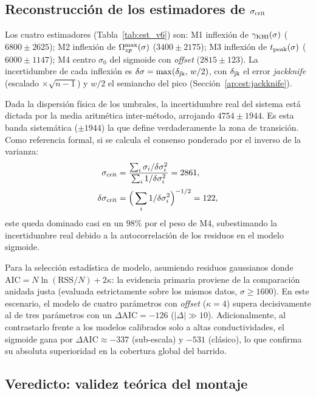 \subsection{Reconstrucción de los estimadores de $\sigma_{\mathrm{crit}}$}
\label{ap:estim}

\primerparrafo Los cuatro estimadores (Tabla~\ref{tab:est_v6}) son: M1 inflexión de $\gamma_{\mathrm{KHI}}(\sigma)$ ($6800\pm2625$); M2 inflexión de $\Omega_{zp}^{\max}(\sigma)$ ($3400\pm2175$); M3 inflexión de $t_{\rm peak}(\sigma)$ ($6000\pm1147$); M4 centro $\sigma_0$ del sigmoide con \emph{offset} ($2815\pm123$). La incertidumbre de cada inflexión es $\delta\sigma=\max(\delta_{\rm jk},\,w/2)$, con $\delta_{\rm jk}$ el error \emph{jackknife} (escalado $\times\sqrt{n-1}$) y $w/2$ el semiancho del pico (Sección~\ref{ap:est:jackknife}).

Dada la dispersión física de los umbrales, la incertidumbre real del sistema está dictada por la media aritmética inter-método, arrojando $4754\pm1944$. Es esta banda sistemática ($\pm1944$) la que define verdaderamente la zona de transición. Como referencia formal, si se calcula el consenso ponderado por el inverso de la varianza:
\begin{equation}
\begin{aligned}
\sigma_{\mathrm{crit}}&=\frac{\sum_i \sigma_i/\delta\sigma_i^2}{\sum_i 1/\delta\sigma_i^2}=2861,\\[2pt]
\delta\sigma_{\mathrm{crit}}&=\Big(\sum_i 1/\delta\sigma_i^2\Big)^{-1/2}=122,
\end{aligned}
\end{equation}
este queda dominado casi en un $98\%$ por el peso de M4, subestimando la incertidumbre real debido a la autocorrelación de los residuos en el modelo sigmoide.

Para la selección estadística de modelo, asumiendo residuos gaussianos donde $\mathrm{AIC}=N\ln(\mathrm{RSS}/N)+2\kappa$: la evidencia primaria proviene de la comparación anidada justa (evaluada estrictamente sobre los mismos datos, $\sigma \ge 1600$). En este escenario, el modelo de cuatro parámetros con \emph{offset} ($\kappa=4$) supera decisivamente al de tres parámetros con un $\Delta\mathrm{AIC} = -126$ ($|\Delta|\gg10$). Adicionalmente, al contrastarlo frente a los modelos calibrados solo a altas conductividades, el sigmoide gana por $\Delta\mathrm{AIC}\approx-337$ (sub-escala) y $-531$ (clásico), lo que confirma su absoluta superioridad en la cobertura global del barrido.

\subsection{Veredicto: validez teórica del montaje}
\label{ap:veredicto}

